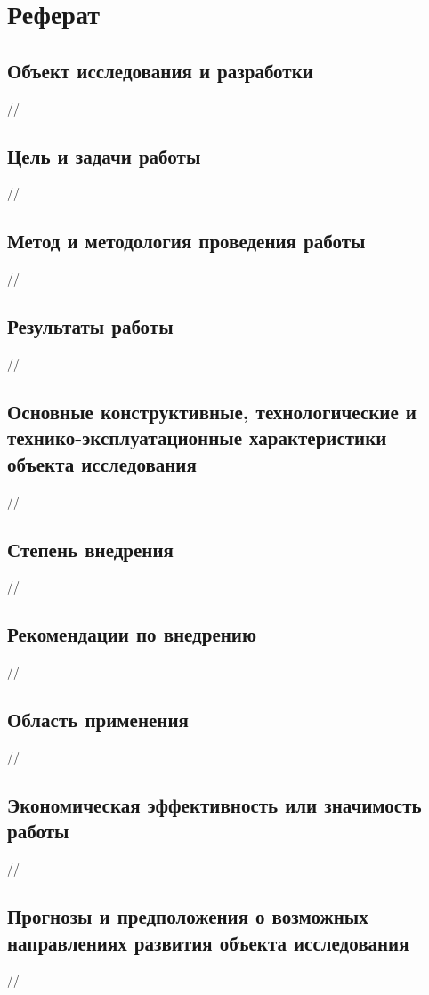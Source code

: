 \chapter{Реферат}

\section{Объект исследования и разработки}
//

\section{Цель и задачи работы}
//

\section{Метод и методология проведения работы}
//

\section{Результаты работы}
//

\section{Основные конструктивные, технологические и технико-эксплуатационные характеристики объекта исследования}
//

\section{Степень внедрения}
//

\section{Рекомендации по внедрению}
//

\section{Область применения}
//

\section{Экономическая эффективность или значимость работы}
//

\section{Прогнозы и предположения о возможных направлениях развития объекта исследования}
//
